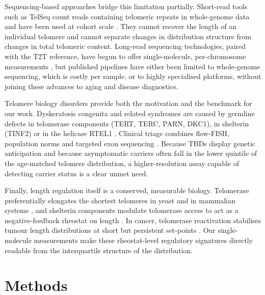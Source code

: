 \documentclass[11pt]{article}
\begin{document}
Sequencing-based approaches bridge this limitation partially. Short-read
tools such as TelSeq count reads containing telomeric repeats in
whole-genome data and have been used at cohort scale
\citep{ding2014telseq,barthel2017systematic,demanelis2020determinants}.
They cannot recover the length of an individual telomere and cannot
separate changes in distribution structure from changes in total
telomeric content. Long-read sequencing technologies, paired with the
T2T reference, have begun to offer single-molecule, per-chromosome
measurements
\citep{tham2023comprehensive,schmidt2023targeted,karimian2024human,nurk2022complete,heller2019telomeres},
but published pipelines have either been limited to whole-genome
sequencing, which is costly per sample, or to highly specialised
platforms, without joining these advances to aging and disease
diagnostics.

Telomere biology disorders provide both the motivation and the benchmark
for our work. Dyskeratosis congenita and related syndromes are caused by
germline defects in telomerase components (TERT, TERC, PARN, DKC1), in
shelterin (TINF2) or in the helicase RTEL1
\citep{tummala2015poly,walne2013constitutional,savage2008tinf2,armanios2012telomeres,bertuch2016molecular}.
Clinical triage combines flow-FISH, population norms and targeted exon
sequencing \citep{alder2018diagnostic}. Because TBDs display genetic
anticipation and because asymptomatic carriers often fall in the lower
quintile of the age-matched telomere distribution, a higher-resolution
assay capable of detecting carrier status is a clear unmet need.

Finally, length regulation itself is a conserved, measurable biology.
Telomerase preferentially elongates the shortest telomeres in yeast and
in mammalian systems
\citep{teixeira2004intertelomere,hemann2001shortest,britt2012preferential},
and shelterin components modulate telomerase access to act as a
negative-feedback rheostat on length
\citep{palm2008howshelterin,hockemeyer2015control}. In cancer,
telomerase reactivation stabilises tumour length distributions at short
but persistent set-points \citep{chiba2015cancer,barthel2017systematic}.
Our single-molecule measurements make these rheostat-level regulatory
signatures directly readable from the interquartile structure of the
distribution.

\section{Methods}
\end{document}
